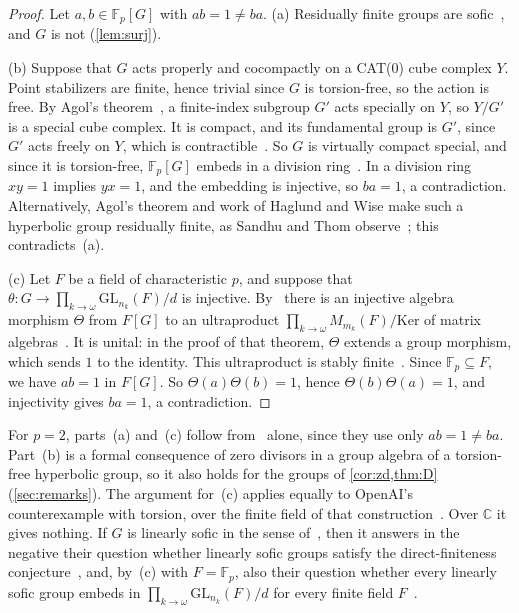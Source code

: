\documentclass[11pt]{article}
\theoremstyle{definition}
\theoremstyle{plain}
\newcommand{\F}{\mathbb{F}}
\newcommand{\C}{\mathbb{C}}
\begin{document}
\begin{proof}
Let $a,b\in\F_p[G]$ with $ab=1\neq ba$. (a) Residually finite groups are sofic~\cite[Prop.~4.6]{ElekSzabo2004}, and $G$ is not (\cref{lem:surj}).

(b) Suppose that $G$ acts properly and cocompactly on a CAT(0) cube complex $Y$. Point stabilizers are finite, hence trivial since $G$ is torsion-free, so the action is free. By Agol's theorem~\cite[Thm.~1.1]{Agol2013}, a finite-index subgroup $G'$ acts specially on $Y$, so $Y/G'$ is a special cube complex. It is compact, and its fundamental group is $G'$, since $G'$ acts freely on $Y$, which is contractible~\cite[Cor.~II.1.5]{BridsonHaefliger1999}. So $G$ is virtually compact special, and since it is torsion-free, $\F_p[G]$ embeds in a division ring~\cite[Thm.~1.3(1)]{FisherSanchezPeralta2026}. In a division ring $xy=1$ implies $yx=1$, and the embedding is injective, so $ba=1$, a contradiction. Alternatively, Agol's theorem and work of Haglund and Wise make such a hyperbolic group residually finite, as Sandhu and Thom observe~\cite[\S1]{SandhuThom2026}; this contradicts~(a).

(c) Let $F$ be a field of characteristic $p$, and suppose that $\theta\colon G\to\prod_{k\to\omega}\mathrm{GL}_{n_k}(F)/d$ is injective. By~\cite[Thm.~7.4]{AP2017} there is an injective algebra morphism $\Theta$ from $F[G]$ to an ultraproduct $\prod_{k\to\omega}M_{m_k}(F)/\mathrm{Ker}$ of matrix algebras~\cite[Def.~2.3]{AP2017}. It is unital: in the proof of that theorem, $\Theta$ extends a group morphism, which sends $1$ to the identity. This ultraproduct is stably finite~\cite[Prop.~2.8]{AP2017}. Since $\F_p\subseteq F$, we have $ab=1$ in $F[G]$. So $\Theta(a)\Theta(b)=1$, hence $\Theta(b)\Theta(a)=1$, and injectivity gives $ba=1$, a contradiction.
\end{proof}

For $p=2$, parts~(a) and~(c) follow from~\cite{OAI197a} alone, since they use only $ab=1\neq ba$. Part~(b) is a formal consequence of zero divisors in a group algebra of a torsion-free hyperbolic group, so it also holds for the groups of \cref{cor:zd,thm:D} (\cref{sec:remarks}). The argument for~(c) applies equally to OpenAI's counterexample with torsion, over the finite field of that construction~\cite{OAI197b}. Over $\C$ it gives nothing. If $G$ is linearly sofic in the sense of~\cite[Def.~4.1]{AP2017}, then it answers in the negative their question whether linearly sofic groups satisfy the direct-finiteness conjecture~\cite[Question~7.9]{AP2017}, and, by~(c) with $F=\F_p$, also their question whether every linearly sofic group embeds in $\prod_{k\to\omega}\mathrm{GL}_{n_k}(F)/d$ for every finite field $F$~\cite[Question~8.6]{AP2017}.
\end{document}
